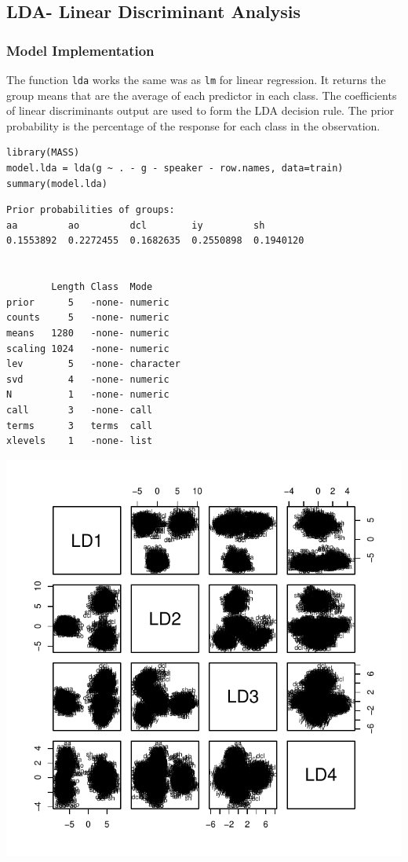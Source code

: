 \documentclass[]{report}
\begin{document}
\subsection{LDA- Linear Discriminant Analysis}

\subsubsection{Model Implementation}
The function \texttt{lda} works the same was as \texttt{lm} for linear regression. It returns the group means that are the average of each predictor in each class. The coefficients of linear discriminants output are used to form the LDA decision rule. The prior probability is the percentage of the response for each class in the observation.

\begin{lstlisting}
library(MASS)
model.lda = lda(g ~ . - g - speaker - row.names, data=train)
summary(model.lda)
\end{lstlisting}

\begin{verbatim}
Prior probabilities of groups:
aa         ao         dcl        iy         sh 
0.1553892  0.2272455  0.1682635  0.2550898  0.1940120 


        Length Class  Mode     
prior      5   -none- numeric  
counts     5   -none- numeric  
means   1280   -none- numeric  
scaling 1024   -none- numeric  
lev        5   -none- character
svd        4   -none- numeric  
N          1   -none- numeric  
call       3   -none- call     
terms      3   terms  call     
xlevels    1   -none- list
\end{verbatim}

\begin{center}
	\includegraphics{Figures/model_lda_plot.pdf}
\end{center}
\end{document}
